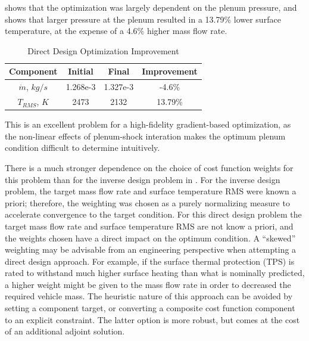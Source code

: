  shows that the optimization was largely dependent on the
plenum pressure, and  shows that larger pressure at
the plenum resulted in a 13.79\% lower surface temperature, at the expense of a
4.6\% higher mass flow rate.
\begin{table}[h]
  \centering
  \begin{tabular}{c|c|c|c}
    Component & Initial & Final & Improvement\\
    \hline
    $\dot{m}$, $kg/s$ & 1.268e-3 & 1.327e-3 & -4.6\% \\
    $T_{RMS}$, $K$    & 2473     & 2132     & 13.79\%
  \end{tabular}
  \caption{Direct Design Optimization Improvement}
  \label{tab:design-improvement}
\end{table}
This is an excellent problem for a high-fidelity gradient-based
optimization, as the non-linear effects of plenum-shock interation makes the
optimum plenum condition difficult to determine intuitively.

There is a much stronger dependence on the choice of cost function weights for
this problem than for the inverse design problem in .  For
the inverse design problem, the target mass flow rate and surface temperature
RMS were known a priori; therefore, the weighting was chosen as a purely
normalizing measure to accelerate convergence to the target condition.  For this
direct design problem the target mass flow rate and surface temperature RMS are
not know a priori, and the weights chosen have a direct impact on the optimum
condition.  A ``skewed'' weighting may be advisable from an engineering
perspective when attempting a direct design approach.  For example, if the
surface thermal protection (TPS) is rated to withstand much higher surface
heating than what is nominally predicted, a higher weight might be given to the
mass flow rate in order to decreased the required vehicle mass.  The heuristic
nature of this approach can be avoided by setting a component target, or
converting a composite cost function component to an explicit constraint.  The
latter option is more robust, but comes at the cost of an additional adjoint
solution.
